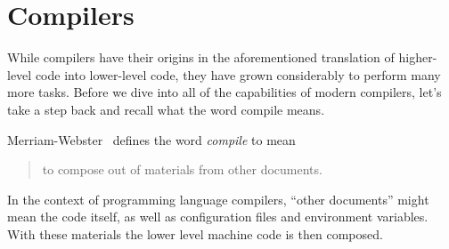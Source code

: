 \section{Compilers}

While compilers have their origins in the aforementioned translation of higher-level code into lower-level code, they have grown considerably to perform many more tasks.
Before we dive into all of the capabilities of modern compilers, let's take a step back and recall what the word compile means.

Merriam-Webster~\cite{compiledef} defines the word \emph{compile} to mean
\begin{quote}
    to compose out of materials from other documents.
\end{quote}
In the context of programming language compilers,  ``other documents'' might mean the code itself, as well as configuration files and environment variables.
With these materials the lower level machine code is then composed.
